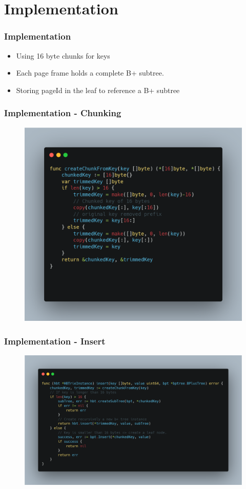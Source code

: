 \documentclass[aspectratio=169]{beamer}
\begin{document}
\section{Implementation}
\begin{frame}[t]
    \frametitle{Implementation}
    \begin{itemize}
    	\item Using 16 byte chunks for keys
    	\item Each page frame holds a complete B+ subtree.
    	\item Storing pageId in the leaf to reference a B+ subtree
    \end{itemize}
\end{frame}
\begin{frame}[t]
	\frametitle{Implementation - Chunking}
	\begin{figure}[h!]
		\includegraphics[scale=0.19]{code_chunking}
	\end{figure}
	\centering
\end{frame}
\begin{frame}[t]
	\frametitle{Implementation - Insert}
	\begin{figure}[h!]
		\includegraphics[scale=0.19]{code_insert}
	\end{figure}
	\centering
\end{frame}
\end{document}
